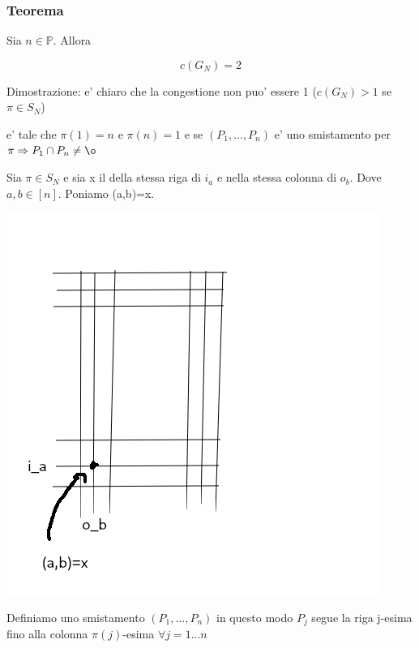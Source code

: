 \documentclass{article}
\begin{document}
        \subsubsection{Teorema}
        \begin{flushleft}
          Sia $n\in \mathbb{P}$. Allora
        \end{flushleft}
        \begin{equation*}
          c(G_N)=2
        \end{equation*}
        \begin{flushleft}
          Dimostrazione: e' chiaro che la congestione non puo' essere 1 ($c(G_N)>1$ se $\pi \in S_N$)
        \end{flushleft}
        \begin{flushleft}
          e' tale che $\pi(1)=n$ e $\pi(n)=1$ e se $(P_1,...,P_n)$ e' uno smistamento per $\pi \Rightarrow P_1 \cap P_n \neq \o$
        \end{flushleft}
        \begin{flushleft}
          Sia $\pi \in S_N$ e sia x il della stessa riga di $i_a$ e nella stessa colonna di $o_b$. Dove $a,b\in [n]$. Poniamo (a,b)=x.
        \end{flushleft}
        \includegraphics[bb=0 0 150 150]{pic/dimostrazioneXvertice.png}
        \begin{flushleft}
          Definiamo uno smistamento $(P_1,...,P_n)$ in questo modo $P_j$ segue la riga j-esima fino alla colonna $\pi(j)$-esima $\forall j=1...n$
        \end{flushleft}
\end{document}
